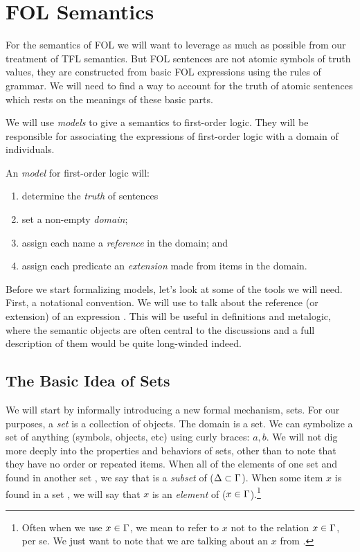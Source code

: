 \section{FOL Semantics}

For the semantics of FOL we will want to leverage as much as possible from our
treatment of TFL semantics. But FOL sentences are not atomic symbols of truth
values, they are constructed from basic FOL expressions using the rules of
grammar. We will need to find a way to account for the truth of atomic sentences
which rests on the meanings of these basic parts.

We will use \emph{models} to give a semantics to first-order logic. They will
be responsible for associating the expressions of first-order logic with a
domain of individuals.

\begin{definition}
  \label{def:jobs-for-model}
  An \emph{model} for first-order logic will:
  \begin{enumerate}
  \item determine the \emph{truth} of sentences
  \item set a non-empty \emph{domain};
  \item assign each name a \emph{reference} in the domain; and
  \item assign each predicate an \emph{extension} made from items in the domain.
  \end{enumerate}
\end{definition}

Before we start formalizing models, let's look at some of the tools we will
need. First, a notational convention. We will use \elib\ealpha\erib to talk
about the reference (or extension) of an expression \ealpha. This will be useful
in definitions and metalogic, where the semantic objects are often central to
the discussions and a full description of them would be quite long-winded
indeed.

\subsection{The Basic Idea of Sets}

We will start by informally introducing a new formal mechanism, sets. For our
purposes, a \emph{set} is a collection of objects. The domain is a set. We can
symbolize a set of anything (symbols, objects, etc) using curly braces: ${a,b}$.
We will not dig more deeply into the properties and behaviors of sets, other
than to note that they have no order or repeated items. When all of the elements
of one set \eDelta and found in another set \eGamma, we say that \eDelta is a
\emph{subset} of \eGamma ($\Delta\subset\Gamma$). When some item $x$ is
found in a set \eGamma, we will say that $x$ is an \emph{element} of \eGamma
($x\in\Gamma$).\footnote{Often when we use $x\in\Gamma$, we mean to refer
to $x$ not to the relation $x\in\Gamma$, per se. We just want to note that
we are talking about an $x$ from \eGamma.}

